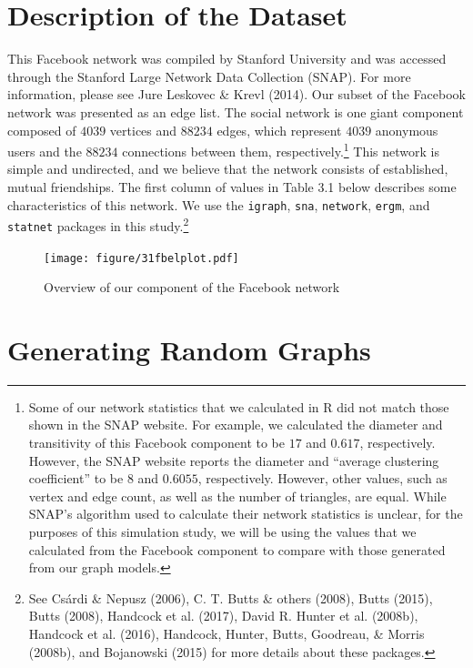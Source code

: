 \documentclass[12pt,twoside]{amherstthesis}
\begin{document}
  \section{Description of the Dataset}\label{description-of-the-dataset}
  
  This Facebook network was compiled by Stanford University and was
  accessed through the Stanford Large Network Data Collection (SNAP). For
  more information, please see Jure Leskovec \& Krevl (2014). Our subset
  of the Facebook network was presented as an edge list. The social
  network is one giant component composed of \(4039\) vertices and
  \(88234\) edges, which represent \(4039\) anonymous users and the
  \(88234\) connections between them, respectively.\footnote{Some of our
    network statistics that we calculated in R did not match those shown
    in the SNAP website. For example, we calculated the diameter and
    transitivity of this Facebook component to be \(17\) and \(0.617\),
    respectively. However, the SNAP website reports the diameter and
    ``average clustering coefficient'' to be \(8\) and \(0.6055\),
    respectively. However, other values, such as vertex and edge count, as
    well as the number of triangles, are equal. While SNAP's algorithm
    used to calculate their network statistics is unclear, for the
    purposes of this simulation study, we will be using the values that we
    calculated from the Facebook component to compare with those generated
    from our graph models.} This network is simple and undirected, and we
  believe that the network consists of established, mutual friendships.
  The first column of values in Table 3.1 below describes some
  characteristics of this network. We use the \texttt{igraph},
  \texttt{sna}, \texttt{network}, \texttt{ergm}, and \texttt{statnet}
  packages in this study.\footnote{See Csárdi \& Nepusz (2006), C. T.
    Butts \& others (2008), Butts (2015), Butts (2008), Handcock et al.
    (2017), David R. Hunter et al. (2008b), Handcock et al. (2016),
    Handcock, Hunter, Butts, Goodreau, \& Morris (2008b), and Bojanowski
    (2015) for more details about these packages.}
  
  \begin{figure}[htbp]
  \centering
  \texttt{[image: figure/31fbelplot.pdf]}
  \caption{Overview of our component of the Facebook network}
  \end{figure}
  
  \section{Generating Random Graphs}\label{generating-random-graphs}
  
\end{document}
